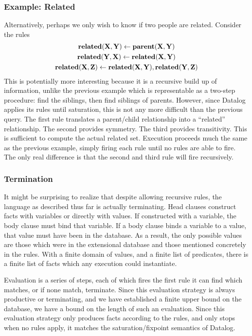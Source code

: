 \subsubsection{Example: Related}
Alternatively, perhaps we only wish to know if two people are related.
Consider the rules
\begin{gather*}
        {\bf related}({\bf X}, {\bf Y}) \leftarrow {\bf parent}({\bf X}, {\bf Y})\\
        {\bf related}({\bf Y}, {\bf X}) \leftarrow {\bf related}({\bf X}, {\bf Y})\\
        {\bf related}({\bf X}, {\bf Z}) \leftarrow {\bf related}({\bf X}, {\bf Y}), {\bf related}({\bf Y}, {\bf Z})
\end{gather*}
This is potentially more interesting because it is a recursive build up of information, unlike the previous example which is representable as a two-step procedure: find the siblings, then find siblings of parents.
However, since Datalog applies its rules until saturation, this is not any more difficult than the previous query.
The first rule translates a parent/child relationship into a ``related'' relationship.
The second provides symmetry.
The third provides transitivity.
This is sufficient to compute the actual related set.
Execution proceeds much the same as the previous example, simply firing each rule until no rules are able to fire.
The only real difference is that the second and third rule will fire recursively.
\subsubsection{Termination}
It might be surprising to realize that despite allowing recursive rules, the language as described thus far is actually terminating.
Head clauses construct facts with variables or directly with values.
If constructed with a variable, the body clause must bind that variable.
If a body clause binds a variable to a value, that value must have been in the database.
As a result, the only possible values are those which were in the extensional database and those mentioned concretely in the rules.
With a finite domain of values, and a finite list of predicates, there is a finite list of facts which any execution could instantiate.

Evaluation is a series of steps, each of which fires the first rule it can find which matches, or if none match, terminate.
Since this evaluation strategy is always productive or terminating, and we have established a finite upper bound on the database, we have a bound on the length of such an evaluation.
Since this evaluation strategy only produces facts according to the rules, and only stops when no rules apply, it matches the saturation/fixpoint semantics of Datalog.

